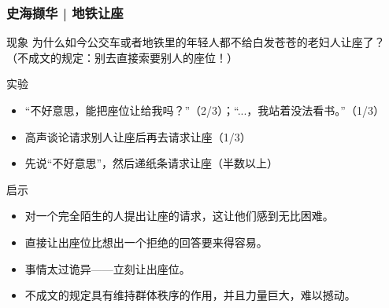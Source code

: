 \begin{frame}
  \frametitle{史海撷华 | 地铁让座}
  \vspace{-0.5em}
  \begin{block}{现象}
为什么如今公交车或者地铁里的年轻人都不给白发苍苍的老妇人让座了？（不成文的规定：别去直接索要别人的座位！）
  \end{block}
  \vspace{-0.5em}
  \pause
  \begin{block}{实验}
    \begin{itemize}
      \item “不好意思，能把座位让给我吗？”（2/3）；“...，我站着没法看书。”（1/3）
      \item 高声谈论请求别人让座后再去请求让座（1/3）
      \item 先说“不好意思”，然后递纸条请求让座（半数以上）
    \end{itemize}
  \end{block}
  \vspace{-0.5em}
  \pause
  \begin{block}{启示}
    \begin{itemize}
      \item 对一个完全陌生的人提出让座的请求，这让他们感到无比困难。
      \item 直接让出座位比想出一个拒绝的回答要来得容易。
      \item 事情太过诡异——立刻让出座位。
      \item 不成文的规定具有维持群体秩序的作用，并且力量巨大，难以撼动。
    \end{itemize}
  \end{block}
\end{frame}

